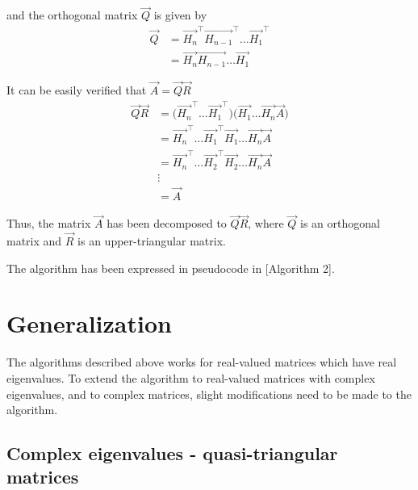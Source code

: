 \documentclass{article}
\begin{document}
and the orthogonal matrix $\vec{Q}$ is given by
\begin{align}
    \vec{Q} &= \vec{H_n}^\top \vec{H_{n-1}}^\top \dots \vec{H_1}^\top \\
    &= \vec{H_n} \vec{H_{n-1}} \dots \vec{H_1}
\end{align}

It can be easily verified that $\vec{A} = \vec{Q}\vec{R}$
\begin{align}
    \vec{Q}\vec{R} &= \Big( \vec{H_n}^\top \dots \vec{H_1}^\top \Big) \Big( \vec{H_1}\dots\vec{H_n}\vec{A} \Big) \\ 
    &= \vec{H_n}^\top \dots \vec{H_1}^\top\vec{H_1} \dots \vec{H_n} \vec{A} \\
    &= \vec{H_n}^\top \dots \vec{H_2}^\top\vec{H_2} \dots \vec{H_n} \vec{A} \\
    &\vdots \\
    &= \vec{A}
\end{align}

Thus, the matrix $\vec{A}$ has been decomposed to $\vec{Q}\vec{R}$, where $\vec{Q}$ is
an orthogonal matrix and $\vec{R}$ is an upper-triangular matrix.

The algorithm has been expressed in pseudocode in [Algorithm 2].

\begin{algorithm}
\end{algorithm}


\section{Generalization}

The algorithms described above works for real-valued matrices which have real 
eigenvalues. To extend the algorithm to real-valued matrices with complex eigenvalues,
and to complex matrices, slight modifications need to be made to the algorithm.

\subsection{Complex eigenvalues - quasi-triangular matrices}
\end{document}
